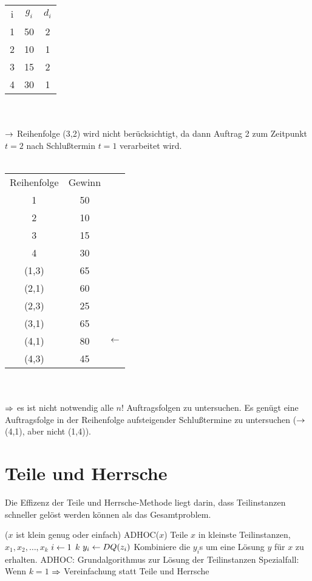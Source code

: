 \documentclass[a4paper]{scrartcl}
\begin{document}
\begin{tabular}{ccc}
i	& $g_i$	& $d_i$ \\
1	& 50	& 2 \\
2	& 10	& 1 \\
3	& 15	& 2 \\
4	& 30	& 1 \\
\end{tabular} \\
\\
$\rightarrow$ Reihenfolge (3,2) wird nicht berücksichtigt, da dann Auftrag 2 zum Zeitpunkt $t=2$ nach Schlußtermin $t=1$ verarbeitet wird. \\
\\
\begin{tabular}{ccl}
Reihenfolge & Gewinn \\
1		& 50 \\
2		& 10 \\
3		& 15 \\
4		& 30 \\
(1,3)	& 65 \\
(2,1)	& 60 \\
(2,3)	& 25 \\
(3,1)	& 65 \\
(4,1)	& 80 & $\leftarrow$\\
(4,3)	& 45 \\
\end{tabular} \\
\\
$\Rightarrow$ es ist nicht notwendig alle $n!$ Auftragsfolgen zu untersuchen. Es genügt eine Auftragsfolge in der Reihenfolge aufsteigender Schlußtermine zu untersuchen ($\rightarrow$ (4,1), aber nicht (1,4)).


\section{Teile und Herrsche}

Die Effizenz der Teile und Herrsche-Methode liegt darin, dass Teilinstanzen schneller gelöst werden
können als das Gesamtproblem.

\begin{codebox}
\li	\If ($x$ ist klein genug oder einfach)
\li		\Then \Return ADHOC($x$)
		\End
\li Teile $x$ in kleinste Teilinstanzen, $x_1, x_2, \ldots, x_k$
\li \For $i \leftarrow 1$ \To $k$
\li		\Do
					$y_i \leftarrow DQ(z_i)$
		\End
\li Kombiniere die $y_i$s um eine Lösung $y$ für $x$ zu erhalten.
\zi	ADHOC: Grundalgorithmus zur Lösung der Teilinstanzen
\zi	Spezialfall: Wenn $k=1$ $\Rightarrow$ Vereinfachung statt Teile und Herrsche
\end{codebox}
\end{document}
